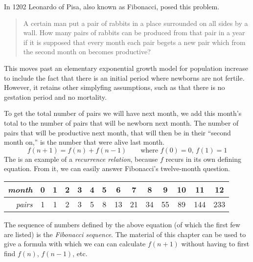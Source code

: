 
In 1202 Leonardo of Pisa, also known as Fibonacci, posed this problem.
\begin{quotation}
  A certain man put a pair of rabbits in a place surrounded on all sides by a 
  wall.
  How many pairs of rabbits can be produced from that pair in a year if it
  is supposed that every month each pair begets a new pair which from the 
  second month on becomes productive? 
\end{quotation}
This moves past an elementary exponential growth model for
population increase
to include the fact that there is an initial period where 
newborns are not fertile.
However, it retains other simplyfing assumptions, such as  
that there is no gestation period and no mortality.

To get the total number of pairs we will have next month,
we add this month's total to the number
of pairs that will be newborn next month.
The number of pairs that will be productive next month, that will then be
in their ``second month on,'' is the number that were alive last
month.
\begin{equation*}
  f(n+1)=f(n)+f(n-1)  \qquad \text{where $f(0)=0$, $f(1)=1$}
\end{equation*}
The is an example of a \emph{recurrence relation},
because $f$ recurs in its own defining equation.
From it, we can easily answer Fibonacci's twelve-month question.
\begin{center}
  \begin{tabular}{r|ccccccccccccc}
    \textit{month}
     &0  &1  &2  &3  &4  &5  &6  &7  &8  &9  &10  &11  &12  \\ \hline
    \textit{pairs}
     &1  &1  &2  &3  &5  &8  &13  &21  &34  &55  &89  &144  &233  
  \end{tabular}
\end{center}
The sequence of numbers defined by the above equation (of which the first few
are listed) is the \emph{Fibonacci sequence}.
The material of this chapter can be used to give a formula with which we can
can calculate $f(n+1)$ without having to first find $f(n)$, $f(n-1)$, etc.

